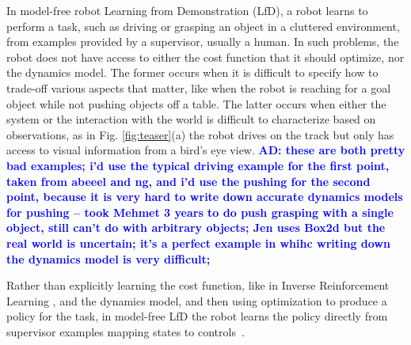 \documentclass[10pt, conference]{ieeeconf}      %
\newcommand{\adnote}[1]{\ifthenelse{ \boolean{include-notes}}%
 {\textcolor{blue}{\textbf{AD: #1}}}{}}
\begin{document}
In model-free robot Learning from Demonstration (LfD), a robot learns to perform a task, such as driving or grasping an object in a cluttered environment, from examples provided by a  supervisor, usually a human.  In such problems, the robot does not have access to either the cost function that it should optimize, nor the dynamics model. The former occurs when it is difficult to specify how to trade-off various aspects that matter, like when the robot is reaching for a goal object while not pushing objects off a table.  The latter occurs when either the system or the interaction with the world is difficult to characterize based on observations, as in Fig. \ref{fig:teaser}(a) the robot drives on the track but only has access to visual information from a bird's eye view.\adnote{these are both pretty bad examples; i'd use the typical driving example for the first point, taken from abeeel and ng, and i'd use the pushing for the second point, because it is very hard to write down accurate dynamics models for pushing -- took Mehmet 3 years to do push grasping with a single object, still can't do with arbitrary objects; Jen uses Box2d but the real world is uncertain; it's a perfect example in whihc writing down the dynamics model is very difficult;} 

Rather than explicitly learning the cost function, like in Inverse Reinforcement Learning \cite{ng2000algorithms}, and the dynamics model, and then using optimization to produce a policy for the task, in model-free LfD the robot learns the policy directly from supervisor examples mapping states to controls~\cite{argall2009survey}. 

 
\end{document}
